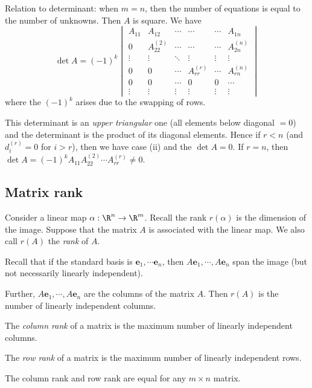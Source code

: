 \documentclass[a4paper]{article}
\begin{document}
Relation to determinant: when $m = n$, then the number of equations is equal to the number of unknowns. Then $A$ is square. We have
\[
  \det A  = (-1)^k
  \begin{vmatrix}
    A_{11} &A_{12}&\cdots& \cdots& \cdots & A_{1n}\\
    0 & A_{22}^{(2)} &\cdots& \cdots & \cdots & A_{2n}^{(n)} \\
    \vdots & \vdots &\ddots & \vdots & \vdots & \vdots\\
    0 & 0 & \cdots & A_{rr}^{(r)} & \cdots & A_{rn}^{(n)}\\
    0 & 0 & \cdots & 0 & 0 & \cdots\\
    \vdots & \vdots & \vdots & \vdots & \vdots & \vdots
  \end{vmatrix}
\]
where the $(-1)^k$ arises due to the swapping of rows.

This determinant is an \emph{upper triangular} one (all elements below diagonal $= 0$) and the determinant is the product of its diagonal elements.
Hence if $r < n$ (and $d_i^{(r)} = 0$ for $i > r$), then we have case (ii) and the $\det A = 0$. If $r = n$, then $\det A = (-1)^k A_{11}A_{22}^{(2)}\cdots A_{rr}^{(r)} \not= 0$.

\subsection{Matrix rank}
Consider a linear map $\alpha: \R^n\to \R^m$. Recall the rank $r(\alpha)$ is the dimension of the image. Suppose that the matrix $A$ is associated with the linear map. We also call $r(A)$ the \emph{rank} of $A$.

Recall that if the standard basis is $\mathbf{e}_1,\cdots \mathbf{e}_n$, then $A\mathbf{e}_1, \cdots, A\mathbf{e}_n$ span the image (but not necessarily linearly independent).

Further, $A\mathbf{e}_1, \cdots, A\mathbf{e}_n$ are the columns of the matrix $A$. Then $r(A)$ is the number of linearly independent columns.

\begin{defi}
  The \emph{column rank} of a matrix is the maximum number of linearly independent columns.

  The \emph{row rank} of a matrix is the maximum number of linearly independent rows.
\end{defi}

\begin{thm}
  The column rank and row rank are equal for any $m\times n$ matrix.
\end{thm}
\end{document}
